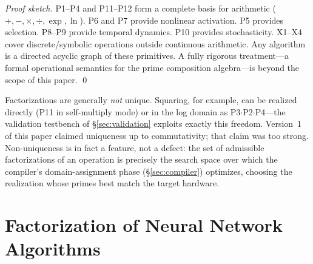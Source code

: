 \documentclass[11pt]{article}
\begin{document}
\begin{proof}[Proof sketch]
P1--P4 and P11--P12 form a complete basis for arithmetic ($+, -, \times, \div, \exp, \ln$). P6 and P7 provide nonlinear activation. P5 provides selection. P8--P9 provide temporal dynamics. P10 provides stochasticity. X1--X4 cover discrete/symbolic operations outside continuous arithmetic. Any algorithm is a directed acyclic graph of these primitives. A fully rigorous treatment---a formal operational semantics for the prime composition algebra---is beyond the scope of this paper. \qed
\end{proof}

Factorizations are generally \textit{not} unique. Squaring, for example, can be realized directly (P11 in self-multiply mode) or in the log domain as P3$\cdot$P2$\cdot$P4---the validation testbench of \S\ref{sec:validation} exploits exactly this freedom. Version~1 of this paper claimed uniqueness up to commutativity; that claim was too strong. Non-uniqueness is in fact a feature, not a defect: the set of admissible factorizations of an operation is precisely the search space over which the compiler's domain-assignment phase (\S\ref{sec:compiler}) optimizes, choosing the realization whose primes best match the target hardware.

\section{Factorization of Neural Network Algorithms}
\label{sec:factorization}
\end{document}
